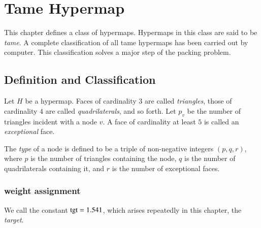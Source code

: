 


\chapter{Tame Hypermap}

\label{sec:tame}


This chapter defines a class of hypermaps.  Hypermaps in this class
are said to be {\it tame}.  A complete
classification of all tame hypermaps has been carried out by computer.   This classification solves a
major step of the packing problem.

\section{Definition and Classification}


\begin{definition}
Let $H$ be a hypermap.
Faces of cardinality $3$ are called {\it triangles}, those of
cardinality $4$ are called {\it quadrilaterals}, and so forth. Let
$p_v$ be the number of triangles incident with a node $v$. A face of
cardinality at least $5$ is called an {\it exceptional\/} face.
\end{definition}

\begin{definition}[type,~$(p,q,r)$]\label{definition:type}
The {\it type\/} of a node is defined to be a triple of
non-negative integers $(p,q,r)$, where $p$ is the number of
triangles containing the node, $q$ is the number of quadrilaterals
containing it, and $r$ is the number of exceptional faces.
%
\end{definition}


\subsection{weight assignment}\label{sec:wtassign}

We call the constant ${\operatorname{tgt}}=1.541$, which arises repeatedly in
this chapter, the {\it target}. 
%

